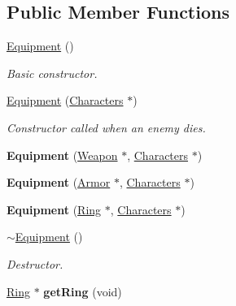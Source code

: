 \subsection*{Public Member Functions}
\begin{DoxyCompactItemize}
\item 
\hyperlink{class_equipment_a2bd67c4254f2074f4f7469f29a20e760}{Equipment} ()
\begin{DoxyCompactList}\small\item\em Basic constructor. \end{DoxyCompactList}\item 
\hyperlink{class_equipment_aeb2356275b65e0d7874aeaee05dc30a4}{Equipment} (\hyperlink{class_characters}{Characters} $\ast$)
\begin{DoxyCompactList}\small\item\em Constructor called when an enemy dies. \end{DoxyCompactList}\item 
\hypertarget{class_equipment_aad2bafad2e0b780e3451da80b5414a62}{{\bfseries Equipment} (\hyperlink{class_weapon}{Weapon} $\ast$, \hyperlink{class_characters}{Characters} $\ast$)}\label{class_equipment_aad2bafad2e0b780e3451da80b5414a62}

\item 
\hypertarget{class_equipment_a1364671a5336020993020388d0f4a80b}{{\bfseries Equipment} (\hyperlink{class_armor}{Armor} $\ast$, \hyperlink{class_characters}{Characters} $\ast$)}\label{class_equipment_a1364671a5336020993020388d0f4a80b}

\item 
\hypertarget{class_equipment_a36564cf71dacc682dca4b9d3f8d8f5b8}{{\bfseries Equipment} (\hyperlink{class_ring}{Ring} $\ast$, \hyperlink{class_characters}{Characters} $\ast$)}\label{class_equipment_a36564cf71dacc682dca4b9d3f8d8f5b8}

\item 
\hypertarget{class_equipment_a3e7f53e57fa3004b5a4490e2c7a1fbaf}{\hyperlink{class_equipment_a3e7f53e57fa3004b5a4490e2c7a1fbaf}{$\sim$\+Equipment} ()}\label{class_equipment_a3e7f53e57fa3004b5a4490e2c7a1fbaf}

\begin{DoxyCompactList}\small\item\em Destructor. \end{DoxyCompactList}\item 
\hypertarget{class_equipment_a0f721d0f27cea8e8d4946b591ab6ac32}{\hyperlink{class_ring}{Ring} $\ast$ {\bfseries get\+Ring} (void)}\label{class_equipment_a0f721d0f27cea8e8d4946b591ab6ac32}


\end{DoxyCompactItemize}
